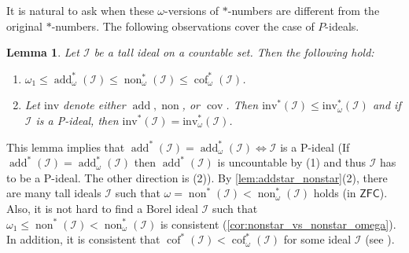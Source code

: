 \documentclass[a4paper,12pt]{amsart}
\newtheorem{lem}[thm]{Lemma}
\theoremstyle{definition}
\numberwithin{thm}{section}
\numberwithin{equation}{section}
\DeclareMathOperator{\non}{non}
\DeclareMathOperator{\cov}{cov}
\DeclareMathOperator{\add}{add}
\DeclareMathOperator{\cof}{cof}
\newcommand{\I}{\mathscr{I}}
\begin{document}
    It is natural to ask when these $\omega$-versions of $*$-numbers are different from the original $*$-numbers. The following observations cover the case of $P$-ideals.

    \begin{lem}
        Let $\I$ be a tall ideal on a countable set. Then the following hold:
        \begin{enumerate}
            \item $\omega_1\leq\add^*_\omega(\I)\leq\non^*_\omega(\I)\leq\cof^*_\omega(\I)$.
            \item Let $\mathrm{inv}$ denote either $\add, \non$, or $\cov$. Then $\mathrm{inv}^*(\I) \leq \mathrm{inv}^*_\omega(\I)$ and if $\I$ is a P-ideal, then $\mathrm{inv}^*(\I) = \mathrm{inv}^*_\omega(\I)$.
        \end{enumerate}
    \end{lem}
    
    This lemma implies that $\add^*(\I) = \add^*_\omega(\I) \iff \I$ is a P-ideal (If $\add^*(\I) = \add^*_\omega(\I)$ then $\add^*(\I)$ is uncountable by (1) and thus $\I$ has to be a P-ideal. The other direction is (2)).
    By \cref{lem:addstar_nonstar}(2), there are many tall ideals $\I$ such that $\omega = \non^*(\I) < \non^*_\omega(\I)$ holds (in $\mathsf{ZFC}$). Also, it is not hard to find a Borel ideal $\I$ such that $\omega_1\leq \non^*(\I) < \non^*_\omega(\I)$ is consistent (\cref{cor:nonstar_vs_nonstar_omega}).
    In addition, it is consistent that $\cof^*(\I) < \cof^*_\omega(\I)$ for some ideal $\I$ (see ). 
    
\end{document}
